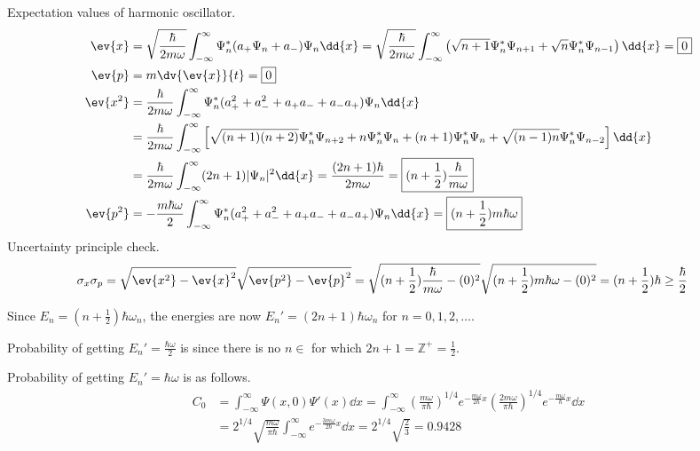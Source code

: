 \documentclass{homework}
\begin{document}
\maketitle

\question
Expectation values of harmonic oscillator.
\begin{align*}
	\ev{x}
		&=	\sqrt{\frac{\hbar}{2m\omega}} \int_{-\infty}^{\infty}	\Psi_n^*(a_+ \Psi_n + a_-) \Psi_n \dd{x}
		=	\sqrt{\frac{\hbar}{2m\omega}} \int_{-\infty}^{\infty}	\left( \sqrt{n+1}\Psi_n^*\Psi_{n+1} + \sqrt{n}\Psi_n^*\Psi_{n-1}	\right) 	\dd{x}
		=	\boxed{0} \\
	\ev{p}
		&=	m \dv{\ev{x}}{t}
		= \boxed{0}	\\
	\ev{x^2}
		&=	\frac{\hbar}{2m\omega} \int_{-\infty}^{\infty}	\Psi_n^* (a_+^2 + a_-^2 + a_+a_- + a_-a_+) \Psi_n	\dd{x}	\\
		&=	\frac{\hbar}{2m\omega} \int_{-\infty}^{\infty}	\left[	\sqrt{(n+1)(n+2)}\Psi_n^*\Psi_{n+2} + n\Psi_n^*\Psi_n + (n+1)\Psi_n^*\Psi_n + \sqrt{(n-1)n} \Psi_n^*\Psi_{n-2} \right] 	\dd{x}	\\
		&=	\frac{\hbar}{2m\omega} \int_{-\infty}^{\infty}	(2n+1) |\Psi_n|^2	\dd{x}
		=	\frac{(2n+1)\hbar}{2m\omega}
		=	\boxed{(n+\frac{1}{2}) \frac{\hbar}{m\omega}}\\
	\ev{p^2}
		&=	-\frac{m\hbar\omega}{2} \int_{-\infty}^{\infty}	\Psi_n^* (a_+^2 + a_-^2 + a_+a_- + a_-a_+) \Psi_n	\dd{x}
		=	\boxed{(n+\frac{1}{2}) m\hbar\omega}
\end{align*}
Uncertainty principle check.
\begin{align*}
	\sigma_x \sigma_p
		&=	\sqrt{\ev{x^2} - \ev{x}^2} \sqrt{\ev{p^2} - \ev{p}^2}
		=	\sqrt{(n+\frac{1}{2}) \frac{\hbar}{m\omega} - (0)^2} \sqrt{(n+\frac{1}{2}) m\hbar\omega - (0)^2}
		=	(n+\frac{1}{2}) \hbar
		\ge \frac{\hbar}{2}
\end{align*}


\question
Since $E_n = (n+\frac{1}{2}) \hbar \omega_n$, the energies are now $E_n' = (2n+1) \hbar \omega_n$ for $n = 0, 1, 2, \dots$.

Probability of getting $E_n' = \frac{\hbar\omega}{2}$ is  since there is no $n \in $ for which $2n+1 = \mathbb{Z}^+ = \frac{1}{2}$.

Probability of getting $E_n' = \hbar\omega$ is as follows.
\begin{align*}
	C_0
		&=	\int_{-\infty}^{\infty}	\Psi(x,0) \Psi'(x)	\dd{x}
		=	\int_{-\infty}^{\infty}	\left(\frac{m\omega}{\pi\hbar}\right)^{1/4} e^{-\frac{m\omega}{2\hbar}x} \left(\frac{2m\omega}{\pi\hbar}\right)^{1/4} e^{-\frac{m\omega}{\hbar}x} 	\dd{x}	\\
		&=	2^{1/4}	\sqrt{\frac{m\omega}{\pi\hbar}} \int_{-\infty}^{\infty}	e^{-\frac{3m\omega}{2\hbar}x}	\dd{x}
		=	2^{1/4}	\sqrt{\frac{2}{3}}
		=	\boxed{0.9428}
\end{align*}
\end{document}
